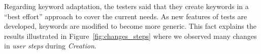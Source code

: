 Regarding keyword adaptation, the testers said that they create keywords in a ``best effort'' approach to cover the current needs. As new features of tests are developed, keywords are modified to become more generic. This fact explains the results illustrated in Figure~\ref{fig:changes_steps} where we observed many changes in \emph{user steps} during \emph{Creation}.